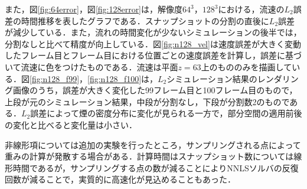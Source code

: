 \documentclass[a4j,12pt]{jreport}
\begin{document}
また，図\ref{fig:64error}，図\ref{fig:128error}は，解像度$64^3$，$128^3$における，流速の$L_2$誤差の時間推移を表したグラフである．スナップショットの分割の直後に$L_2$誤差が減少している．また，流れの時間変化が少ないシミュレーションの後半では，分割なしと比べて精度が向上している．図\ref{fig:n128_vel}は速度誤差が大きく変動したフレーム目とフレーム目における位置ごとの速度誤差を計算し，誤差に基づいて流速に色をつけたものである．流速は平面$z=63$上のもののみを描画している．図\ref{fig:n128_f99}，\ref{fig:n128_f100}は，$L_2$シミュレーション結果のレンダリング画像のうち，誤差が大きく変化した99フレーム目と100フレーム目のもので，上段が元のシミュレーション結果，中段が分割なし，下段が分割数2のものである．$L_2$誤差によって煙の密度分布に変化が見られる一方で，部分空間の適用前後の変化と比べると変化量は小さい．

非線形項については追加の実験を行ったところ，サンプリングされる点によって重みの計算が発散する場合がある．計算時間はスナップショット数については線形時間であるが，サンプリングする点の数が減ることによりNNLSソルバの反復回数が減ることで，実質的に高速化が見込めることもあった．


\end{document}
